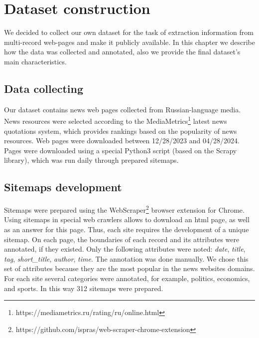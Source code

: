 \section{Dataset construction}
We decided to collect our own dataset for the task of extraction information from multi-record web-pages and make it publicly available. In this chapter we describe how the data was collected and annotated, also we provide the final dataset's main characteristics.

\subsection{Data collecting}
Our dataset contains news web pages collected from Russian-language media. News resources were selected according to the MediaMetrics\footnote{https://mediametrics.ru/rating/ru/online.html} latest news quotations system, which provides rankings based on the popularity of news resources. Web pages were downloaded between 12/28/2023 and 04/28/2024. Pages were downloaded using a special Python3 script (based on the Scrapy library\cite{scrapy_library}), which was run daily through prepared sitemaps.

\subsection{Sitemaps development}
Sitemaps were prepared using the WebScraper\footnote{https://github.com/ispras/web-scraper-chrome-extension} browser extension for Chrome. Using sitemaps in special web crawlers allows to download an html page, as well as an answer for this page. Thus, each site requires the development of a unique sitemap. On each page, the boundaries of each record and its attributes were annotated, if they existed. Only the following attributes were noted: \textit{date}, \textit{title}, \textit{tag}, \textit{short\_title}, \textit{author}, \textit{time}. The annotation was done manually.
We chose this set of attributes because they are the most popular in the news websites domains. 
For each site several categories were annotated, for example, politics, economics, and sports. In this way 312 sitemaps were prepared.


